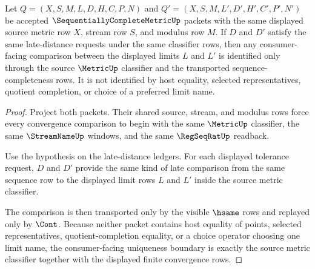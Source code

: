 \begin{theorem}
\label{thm:sequentially-complete-metric-choice-free-uniqueness-boundary}
Let $Q=(X,S,M,L,D,H,C,P,N)$ and $Q'=(X,S,M,L',D',H',C',P',N')$ be accepted $\SequentiallyCompleteMetricUp$ packets with the same displayed source metric row $X$, stream row $S$, and modulus row $M$. If $D$ and $D'$ satisfy the same late-distance requests under the same classifier rows, then any consumer-facing comparison between the displayed limits $L$ and $L'$ is identified only through the source $\MetricUp$ classifier and the transported sequence-completeness rows. It is not identified by host equality, selected representatives, quotient completion, or choice of a preferred limit name.
\end{theorem}
\begin{proof}
Project both packets. Their shared source, stream, and modulus rows force every convergence comparison to begin with the same $\MetricUp$ classifier, the same $\StreamNameUp$ windows, and the same $\RegSeqRatUp$ readback.

Use the hypothesis on the late-distance ledgers. For each displayed tolerance request, $D$ and $D'$ provide the same kind of late comparison from the same sequence row to the displayed limit rows $L$ and $L'$ inside the source metric classifier.

The comparison is then transported only by the visible $\hsame$ rows and replayed only by $\Cont$. Because neither packet contains host equality of points, selected representatives, quotient-completion equality, or a choice operator choosing one limit name, the consumer-facing uniqueness boundary is exactly the source metric classifier together with the displayed finite convergence rows.
\end{proof}

